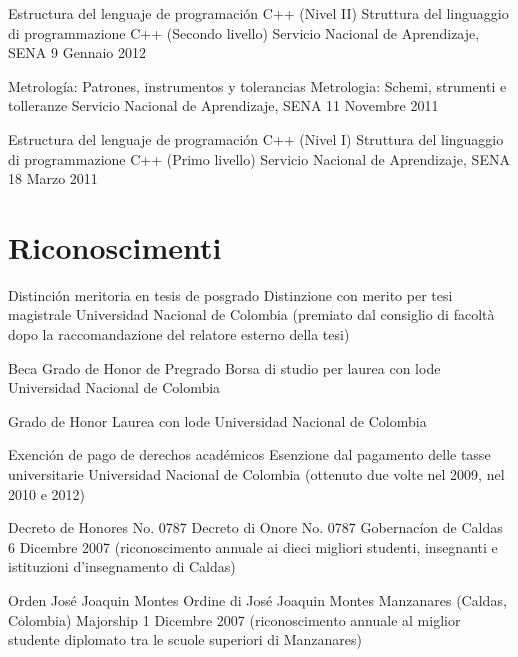 \documentclass[12pt,english]{moderncv}
\begin{document}
        {Estructura del lenguaje de programación C++ (Nivel II)}
        {Struttura del linguaggio di programmazione C++ (Secondo livello)}
        {Servicio Nacional de Aprendizaje, SENA}
        {}
        {9 Gennaio 2012}

        {Metrología: Patrones, instrumentos y tolerancias}
        {Metrologia: Schemi, strumenti e tolleranze}
        {Servicio Nacional de Aprendizaje, SENA}
        {}
        {11 Novembre 2011}

        {Estructura del lenguaje de programación C++ (Nivel I)}
        {Struttura del linguaggio di programmazione C++ (Primo livello)}
        {Servicio Nacional de Aprendizaje, SENA}
        {}
        {18 Marzo 2011}


\section{Riconoscimenti}

        {Distinción meritoria en tesis de posgrado}
        {Distinzione con merito per tesi magistrale}
        {Universidad Nacional de Colombia}
        {}
        {(premiato dal consiglio di facolt\`a dopo la raccomandazione del relatore esterno della tesi)}

        {Beca Grado de Honor de Pregrado}
        {Borsa di studio per laurea con lode}
        {Universidad Nacional de Colombia}
        {}
        {}

        {Grado de Honor}
        {Laurea con lode}
        {Universidad Nacional de Colombia}
        {}
        {}


        {Exención de pago de derechos académicos}
        {Esenzione dal pagamento delle tasse universitarie}
        {Universidad Nacional de Colombia}
        {}
        {(ottenuto due volte nel 2009, nel 2010 e 2012)}


        {Decreto de Honores No. 0787}
        {Decreto di Onore No. 0787}
        {Gobernacíon de Caldas}
        {6 Dicembre 2007}
        {(riconoscimento annuale ai dieci migliori studenti, insegnanti e istituzioni d'insegnamento di Caldas)}


        {Orden José Joaquin Montes}
        {Ordine di José Joaquin Montes}
        {Manzanares (Caldas, Colombia) Majorship}
        {1 Dicembre 2007}
        {(riconoscimento annuale al miglior studente diplomato tra le scuole superiori di Manzanares)}
\end{document}
